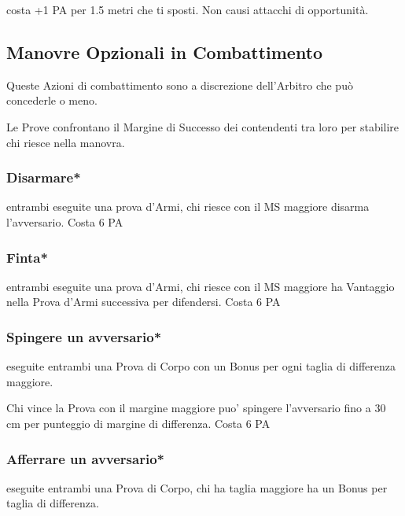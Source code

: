 \documentclass[12pt,a4paper,twoside,openany]{book}
\begin{document}
\begin{multicols}{2}
costa +1 PA per 1.5 metri che ti sposti. Non causi attacchi di opportunità.

\subsection{Manovre Opzionali in Combattimento}\label{azioniopzionaliincombattimento}

Queste Azioni di combattimento sono a discrezione dell'Arbitro che può concederle o meno.

Le Prove confrontano il Margine di Successo dei contendenti tra loro per stabilire chi riesce nella manovra.

\subsubsection{Disarmare*}\label{disarmare}

entrambi eseguite una prova d'Armi, chi riesce con il MS maggiore disarma l'avversario. Costa 6 PA

\subsubsection{Finta*} \label{finta}

entrambi eseguite una prova d'Armi, chi riesce con il MS maggiore ha Vantaggio nella Prova d'Armi successiva per difendersi. Costa 6 PA

\subsubsection{Spingere un avversario*} \label{spingereavversario}\hypertarget{spingereavversario}{}

eseguite entrambi una Prova di Corpo con un Bonus per ogni taglia di differenza maggiore.

Chi vince la Prova con il margine maggiore puo' spingere l'avversario fino a 30 cm per punteggio di margine di differenza. Costa 6 PA

\subsubsection{Afferrare un avversario*}\label{afferrareunavversario}

eseguite entrambi una Prova di Corpo, chi ha taglia maggiore ha un Bonus per taglia di differenza.


\end{multicols}
\end{document}
